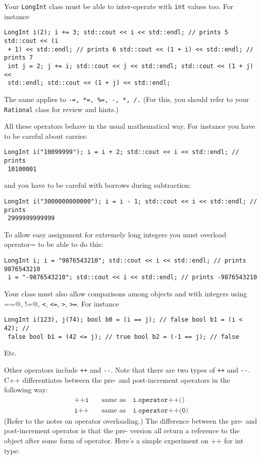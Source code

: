 Your \verb!LongInt! class must be able to inter-operate with \verb!int!  values
too. For instance
\begin{Verbatim}[fontsize=\footnotesize,frame=single]
LongInt i(2); i += 3; std::cout << i << std::endl; // prints 5 std::cout << (i
 + 1) << std::endl; // prints 6 std::cout << (1 + i) << std::endl; // prints 7
 int j = 2; j += i; std::cout << j << std::endl; std::cout << (1 + j) <<
 std::endl; std::cout << (1 + j) << std::endl;
\end{Verbatim}

The same applies to \verb!-=, *=, %=, -, *, /.! (For this, you should refer to
your \verb!Rational! class for review and hints.)

All these operators behave in the usual mathematical way. For instance you have
to be careful about carries:
\begin{Verbatim}[fontsize=\footnotesize,frame=single]
LongInt i("10099999"); i = i + 2; std::cout << i << std::endl; // prints
 10100001
\end{Verbatim}
and you have to be careful with borrows during subtraction:
\begin{Verbatim}[fontsize=\footnotesize,frame=single]
LongInt i("3000000000000"); i = i - 1; std::cout << i << std::endl; // prints
 2999999999999
\end{Verbatim}

To allow easy assignment for extremely long integers you must overload
operator= to be able to do this:
\begin{Verbatim}[fontsize=\footnotesize,frame=single]
LongInt i; i = "9876543210"; std::cout << i << std::endl; // prints 9876543210
 i = "-9876543210"; std::cout << i << std::endl; // prints -9876543210
\end{Verbatim}

Your class must also allow comparisons among objects and with integers using
\verb@==@, \verb@!=@, \verb!<!, \verb!<=!, \verb!>!, \verb!>=!.  For instance
\begin{Verbatim}[fontsize=\footnotesize,frame=single]
LongInt i(123), j(74); bool b0 = (i == j); // false bool b1 = (i < 42); //
 false bool b1 = (42 <= j); // true bool b2 = (-1 == j); // false
\end{Verbatim}

Etc.

Other operators include \verb!++! and \verb!--!. Note that there are two types
of \verb!++! and \verb!--!. C++ differentiates between the pre- and
post-increment operators in the following way:
\begin{align*}
\texttt{++i} \,\,\,\, &\text{ same as } \,\,\,\, \texttt{i.operator++()}
\\ \texttt{i++} \,\,\,\, &\text{ same as } \,\,\,\, \texttt{i.operator++(0)}
\end{align*}
(Refer to the notes on operator overloading.) The difference between the pre-
and post-increment operator is that the pre- version all return a reference to
the object after some form of operator. Here's a simple experiment on ++ for
int type:

